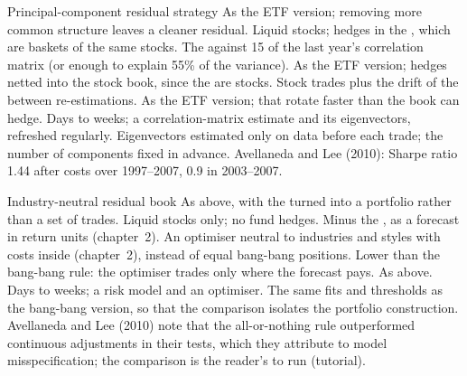 \begin{strategyfile}{Principal-component residual strategy}\label{strat:s1:residual-and-principal-component-stat-arb:pca}
 As the ETF version; removing more common structure leaves a cleaner residual.
 Liquid stocks; hedges in the , which are baskets of the same stocks.
 The  against 15  of the last year's correlation matrix (or enough to explain 55\% of the variance).
 As the ETF version; hedges netted into the stock book, since the  are stocks.
 Stock trades plus the drift of the  between re-estimations.
 As the ETF version;  that rotate faster than the book can hedge.
 Days to weeks; a correlation-matrix estimate and its eigenvectors, refreshed regularly.
 Eigenvectors estimated only on data before each trade; the number of components fixed in advance.
 Avellaneda and Lee (2010): Sharpe ratio 1.44 after costs over 1997--2007, 0.9 in 2003--2007.
\end{strategyfile}

\begin{strategyfile}{Industry-neutral residual book}\label{strat:s1:residual-and-principal-component-stat-arb:industry}
 As above, with the  turned into a portfolio rather than a set of trades.
 Liquid stocks only; no fund hedges.
 Minus the , as a forecast in return units (chapter~2).
 An optimiser neutral to industries and styles with costs inside (chapter~2), instead of equal bang-bang positions.
 Lower than the bang-bang rule: the optimiser trades only where the forecast pays.
 As above.
 Days to weeks; a risk model and an optimiser.
 The same fits and thresholds as the bang-bang version, so that the comparison isolates the portfolio construction.
 Avellaneda and Lee (2010) note that the all-or-nothing rule outperformed continuous adjustments in their tests, which they attribute to model
misspecification; the comparison is the reader's to run (tutorial).
\end{strategyfile}

